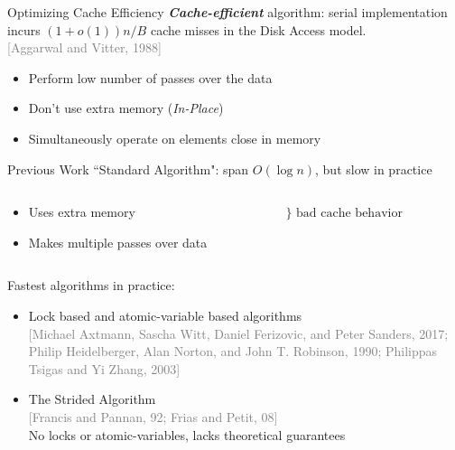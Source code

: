 \documentclass[xcolor=x11names, svgnames, rgb]{beamer}
\newcommand{\defn}[1]       {{\textit{\textbf{\boldmath #1}}}}
\newcommand{\citefont}[1]{{\tiny \textcolor{Gray}{#1}}}
\begin{document}
\begin{frame}[t]{Optimizing Cache Efficiency}
  \defn{Cache-efficient} algorithm: serial implementation incurs $(1+o(1))n/B$
  cache misses in the Disk Access model. \\
  \citefont{[Aggarwal and Vitter, 1988]}
  \vspace{.5cm}
  \begin{itemize}
    \item Perform low number of passes over the data
    \item Don't use extra memory (\emph{In-Place})
    \item Simultaneously operate on elements close in memory
  \end{itemize}
\end{frame}

\begin{frame}[t]{Previous Work}
  ``Standard Algorithm": span $O(\log n)$, but slow in practice
	\begin{columns}[T] %
	\begin{column}{.65\textwidth}
	\begin{itemize}
    \item Uses extra memory
    \item Makes multiple passes over data
	\end{itemize}
	\end{column}
	\begin{column}{.35\textwidth}
	\hspace{-1cm}$\Biggr\}\text{ bad cache behavior}$
	\end{column}
	\end{columns}
	\vspace{0.4 cm}

  Fastest algorithms in practice: 
	\begin{itemize}
  \item Lock based and atomic-variable based algorithms\\ \citefont{[Michael Axtmann, Sascha Witt, Daniel Ferizovic, and Peter Sanders, 2017; Philip Heidelberger, Alan Norton, and John T. Robinson, 1990; Philippas Tsigas and Yi Zhang, 2003]}
		\item The Strided Algorithm\\ \citefont{[Francis and Pannan, 92; Frias and Petit, 08]}\\ 
      No locks or atomic-variables, lacks theoretical guarantees
	\end{itemize}
	\vspace{0.2cm}
\end{frame}
\end{document}
